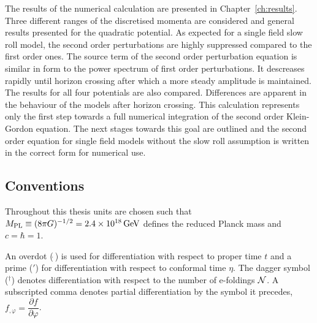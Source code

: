 The results of the numerical calculation are presented in Chapter~\ref{ch:results}.
Three different ranges of the discretised momenta are considered and general
results presented for the quadratic potential. 
As expected for a single field slow
roll model, the second order perturbations are highly suppressed compared to the
first order ones. 
The source term of the second order perturbation equation is similar in form to the
power spectrum of first order perturbations. It descreases rapidly until
horizon
crossing after which a more steady amplitude is maintained.
% 
% 
The results for all four potentials are also compared. Differences are apparent in
the behaviour of the models after horizon crossing.
This calculation represents only the first step towards a full numerical integration
of the second order Klein-Gordon equation. The next stages towards this goal are
outlined and the second order equation for single field models without the slow roll
assumption is written in the correct form for numerical use.







\subsection*{Conventions}
\label{sec:conventions}
Throughout this thesis units are chosen such that $M_{\mathrm{PL}} \equiv (8\pi G )^{-1/2}=
2.4 \times 10^{18}\, {\rm GeV}$ defines the reduced Planck mass and $c=\hbar =1$. 

An overdot ($\dot{~}$) is used for differentiation with respect to proper
time $t$ and a prime ($'$) for differentiation with respect to conformal time
$\eta$. The dagger symbol ($^\dagger$) denotes differentiation with respect to the
number of e-foldings $\mathcal{N}$.
% 
A subscripted comma denotes partial differentiation by the symbol it
precedes, \eg $f_{,\varphi} = \dfrac{\partial f}{\partial \varphi}$.


